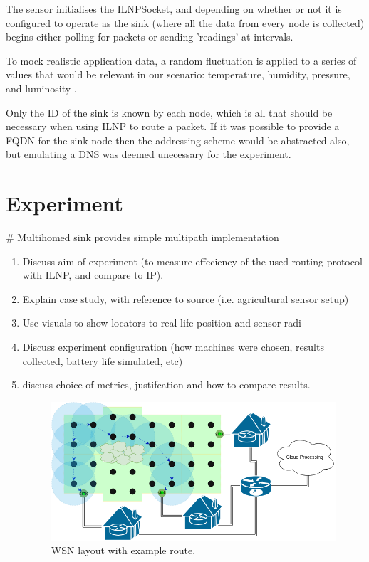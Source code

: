 \documentclass[12pt]{article}
\begin{document}
The sensor initialises the ILNPSocket, and depending on whether or not it is configured to operate as the sink (where all the data from every node is collected) begins either polling for packets or sending 'readings' at intervals.

To mock realistic application data, a random fluctuation is applied to a series of values that would be relevant in our scenario: temperature, humidity, pressure, and luminosity \cite{agrisensor}.

Only the ID of the sink is known by each node, which is all that should be necessary when using ILNP to route a packet. If it was possible to provide a FQDN for the sink node then the addressing scheme would be abstracted also, but emulating a DNS was deemed unecessary for the experiment.

\pagebreak
\section{Experiment}

\# Multihomed sink provides simple multipath implementation

\begin{enumerate}
\item Discuss aim of experiment (to measure effeciency of the used routing protocol with ILNP, and compare to IP).
\item Explain case study, with reference to source (i.e. agricultural sensor setup)
\item Use visuals to show locators to real life position and sensor radi
\item Discuss experiment configuration (how machines were chosen, results collected, battery life simulated, etc)
\item discuss choice of metrics, justifcation and how to compare results.
\begin{figure}[!h]
	\centering
	\includegraphics[width=\linewidth]{images/layout}
	\caption{WSN layout with example route.}
	\label{fig:layout}
\end{figure}
\end{enumerate}
\end{document}

